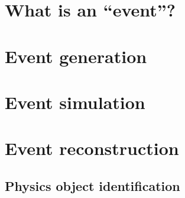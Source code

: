 \section{What is an ``event''? \label{sec:event}}




\section{Event generation \label{sec:event_generation}}




\section{Event simulation \label{sec:event_simulation}}




\section{Event reconstruction \label{sec:event_reconstruction}}






\subsection{Physics object identification \label{sec:event_objects}}

